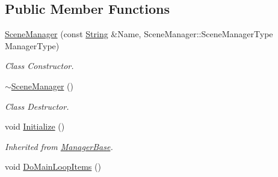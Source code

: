 \subsection*{Public Member Functions}
\begin{DoxyCompactItemize}
\item 
\hyperlink{classphys_1_1SceneManager_a5329396ea9083a117efdffe2bb50885a}{SceneManager} (const \hyperlink{namespacephys_aa03900411993de7fbfec4789bc1d392e}{String} \&Name, SceneManager::SceneManagerType ManagerType)
\begin{DoxyCompactList}\small\item\em Class Constructor. \item\end{DoxyCompactList}\item 
\hyperlink{classphys_1_1SceneManager_a5076643eec92dc0c9c9ccb7ac2225cde}{$\sim$SceneManager} ()
\begin{DoxyCompactList}\small\item\em Class Destructor. \item\end{DoxyCompactList}\item 
\hypertarget{classphys_1_1SceneManager_aa13b380a4e38f706a1977237fc4b165e}{
void \hyperlink{classphys_1_1SceneManager_aa13b380a4e38f706a1977237fc4b165e}{Initialize} ()}
\label{dd/da8/classphys_1_1SceneManager_aa13b380a4e38f706a1977237fc4b165e}

\begin{DoxyCompactList}\small\item\em Inherited from \hyperlink{classphys_1_1ManagerBase}{ManagerBase}. \item\end{DoxyCompactList}\item 
\hypertarget{classphys_1_1SceneManager_a27a3f6b21e15f628642b1cad524f1a18}{
void \hyperlink{classphys_1_1SceneManager_a27a3f6b21e15f628642b1cad524f1a18}{DoMainLoopItems} ()}
\label{dd/da8/classphys_1_1SceneManager_a27a3f6b21e15f628642b1cad524f1a18}


\end{DoxyCompactItemize}
